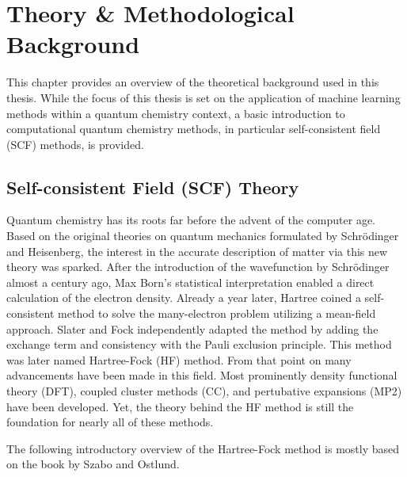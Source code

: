 \chapter{Theory \& Methodological Background}
\label{sec:background}
This chapter provides an overview of the theoretical background used in this thesis. While the focus of this thesis is set on the application of machine learning methods within a quantum chemistry context, a basic introduction to computational quantum chemistry methods, in particular self-consistent field (SCF) methods, is provided. 

\section{Self-consistent Field (SCF) Theory}
\label{sec:background_scf}
Quantum chemistry has its roots far before the advent of the computer age. Based on the original theories on quantum mechanics formulated by Schrödinger and Heisenberg, the interest in the accurate description of matter via this new theory was sparked. After the introduction of the wavefunction by Schrödinger almost a century ago, Max Born's statistical interpretation enabled a direct calculation of the electron density. \parencite{ref:schroedinger_1926undulatory} Already a year later, Hartree coined a self-consistent method to solve the many-electron problem utilizing a mean-field approach. Slater and Fock independently adapted the method by adding the exchange term and consistency with the Pauli exclusion principle. This method was later named Hartree-Fock (HF) method. \parencite{ref:Hartree_1928,ref:slater1930note,ref:fock1930naherungsmethode} From that point on many advancements have been made in this field. Most prominently density functional theory (DFT), coupled cluster methods (CC), and pertubative expansions (MP2) have been developed. Yet, the theory behind the HF method is still the foundation for nearly all of these methods.

The following introductory overview of the Hartree-Fock method is mostly based on the book by Szabo and Ostlund. \parencite{ref:szabo_ostlund}

